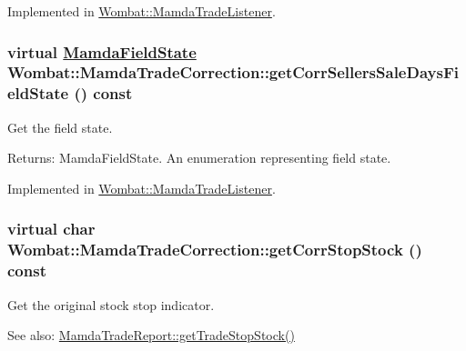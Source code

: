 Implemented in \hyperlink{classWombat_1_1MamdaTradeListener_6078e3eb707240536af985d4135ccc5f}{Wombat::Mamda\-Trade\-Listener}.\hypertarget{classWombat_1_1MamdaTradeCorrection_2a2041c29588e9bec281fba8b942e031}{
\subsubsection[getCorrSellersSaleDaysFieldState]{\setlength{\rightskip}{0pt plus 5cm}virtual \hyperlink{namespaceWombat_93aac974f2ab713554fd12a1fa3b7d2a}{Mamda\-Field\-State} Wombat::Mamda\-Trade\-Correction::get\-Corr\-Sellers\-Sale\-Days\-Field\-State () const}}
\label{classWombat_1_1MamdaTradeCorrection_2a2041c29588e9bec281fba8b942e031}


Get the field state. 

\begin{Desc}
\item[Returns:]Mamda\-Field\-State. An enumeration representing field state. \end{Desc}


Implemented in \hyperlink{classWombat_1_1MamdaTradeListener_58d1851bd56ae820eff6f32eefa7509d}{Wombat::Mamda\-Trade\-Listener}.\hypertarget{classWombat_1_1MamdaTradeCorrection_ab10389dc4e9d523491374ac67e4024a}{
\subsubsection[getCorrStopStock]{\setlength{\rightskip}{0pt plus 5cm}virtual char Wombat::Mamda\-Trade\-Correction::get\-Corr\-Stop\-Stock () const}}
\label{classWombat_1_1MamdaTradeCorrection_ab10389dc4e9d523491374ac67e4024a}


Get the original stock stop indicator. 

\begin{Desc}
\item[See also:]\hyperlink{classWombat_1_1MamdaTradeReport_5e97df5f0d331db50a07db5ebf9336da}{Mamda\-Trade\-Report::get\-Trade\-Stop\-Stock()} \end{Desc}


